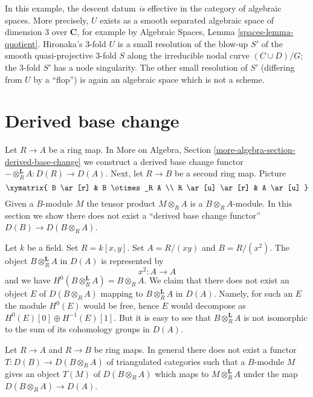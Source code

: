 \noindent
In this example, the descent datum {\it is }effective in the category
of algebraic spaces. More precisely,
$U$ exists as a smooth separated algebraic space
of dimension 3 over ${\mathbf C}$,
for example by Algebraic Spaces, Lemma \ref{spaces-lemma-quotient}.
Hironaka's 3-fold $U$ is a small resolution of the blow-up $S'$
of the smooth quasi-projective 3-fold $S$ along the irreducible nodal curve
$(C\cup D)/G$; the 3-fold $S'$ has a node singularity. The
other small resolution of $S'$ (differing from $U$ by a ``flop'')
is again an algebraic space which is not a scheme.



\section{Derived base change}
\label{section-derived-base-change}

\noindent
Let $R \to A$ be a ring map. In
More on Algebra, Section \ref{more-algebra-section-derived-base-change}
we construct a derived base change functor
$- \otimes_R^\mathbf{L} A : D(R) \to D(A)$.
Next, let $R \to B$ be a second ring map. Picture
$$
\xymatrix{
B \ar[r] & B \otimes_R A \\
R \ar[u] \ar[r] & A \ar[u]
}
$$
Given a $B$-module $M$ the tensor product $M \otimes_R A$ is a
$B \otimes_R A$-module. In this section we show there does not exist a
``derived base change functor'' $D(B) \to D(B \otimes_R A)$.

\medskip\noindent
Let $k$ be a field. Set $R = k[x, y]$. Set $A = R/(xy)$ and $B = R/(x^2)$.
The object $B \otimes_R^\mathbf{L} A$ in $D(A)$ is represented by
$$
x^2 : A \longrightarrow A
$$
and we have $H^0(B \otimes_R^\mathbf{L} A) = B \otimes_R A$. We claim that
there does not exist an object $E$ of $D(B \otimes_R A)$ mapping to
$B \otimes_R^\mathbf{L} A$ in $D(A)$. Namely, for such an $E$ the module
$H^0(E)$ would be free, hence $E$ would decompose as
$H^0(E)[0] \oplus H^{-1}(E)[1]$. But it is easy to see that
$B \otimes_R^\mathbf{L} A$ is not isomorphic to the sum of its
cohomology groups in $D(A)$.

\begin{lemma}
\label{lemma-no-derived-base-change}
Let $R \to A$ and $R \to B$ be ring maps. In general there does not
exist a functor $T : D(B) \to D(B \otimes_R A)$
of triangulated categories such that a $B$-module $M$ gives an
object $T(M)$ of $D(B \otimes_R A)$ which maps to
$M \otimes_R^\mathbf{L} A$ under the map $D(B \otimes_R A) \to D(A)$.
\end{lemma}

